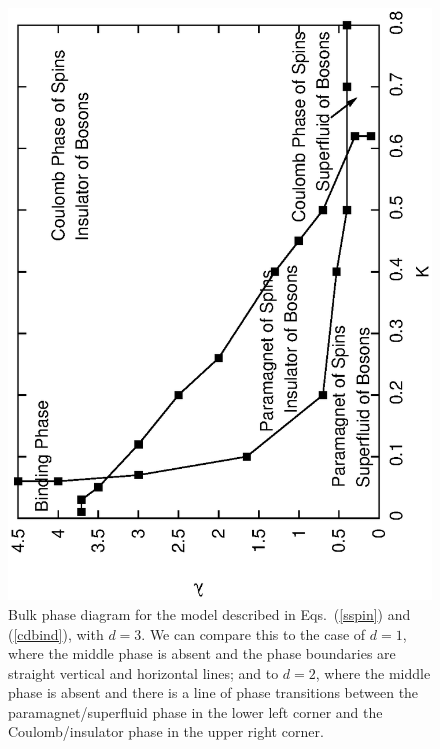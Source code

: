 \documentclass[prb,twocolumn]{revtex4-1}
\begin{document}
\begin{figure}
\includegraphics[angle=-90,width=0.9\linewidth]{figures/fracphase.eps}
\caption{Bulk phase diagram for the model described in Eqs.~(\ref{sspin}) and (\ref{cdbind}), with $d=3$. We can compare this to the case of $d=1$, where the middle phase is absent and the phase boundaries are straight vertical and horizontal lines; and to $d=2$, where the middle phase is absent and there is a line of phase transitions between the paramagnet/superfluid phase in the lower left corner and the Coulomb/insulator phase in the upper right corner.}
\label{fracphase}
\end{figure}
\end{document}
